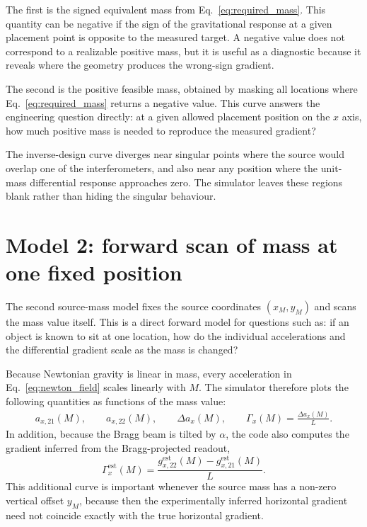 \documentclass[11pt]{article}
\begin{document}
The first is the signed equivalent mass from Eq.~\eqref{eq:required_mass}. This quantity can be negative if the sign of the gravitational response at a given placement point is opposite to the measured target. A negative value does not correspond to a realizable positive mass, but it is useful as a diagnostic because it reveals where the geometry produces the wrong-sign gradient.

The second is the positive feasible mass, obtained by masking all locations where Eq.~\eqref{eq:required_mass} returns a negative value. This curve answers the engineering question directly: at a given allowed placement position on the $x$ axis, how much positive mass is needed to reproduce the measured gradient?

The inverse-design curve diverges near singular points where the source would overlap one of the interferometers, and also near any position where the unit-mass differential response approaches zero. The simulator leaves these regions blank rather than hiding the singular behaviour.

\section{Model 2: forward scan of mass at one fixed position}

The second source-mass model fixes the source coordinates $(x_M, y_M)$ and scans the mass value itself. This is a direct forward model for questions such as: if an object is known to sit at one location, how do the individual accelerations and the differential gradient scale as the mass is changed?

Because Newtonian gravity is linear in mass, every acceleration in Eq.~\eqref{eq:newton_field} scales linearly with $M$. The simulator therefore plots the following quantities as functions of the mass value:
\begin{align}
 a_{x,21}(M), \qquad a_{x,22}(M), \qquad \Delta a_x(M), \qquad \Gamma_x(M) = \frac{\Delta a_x(M)}{L}.
\end{align}
In addition, because the Bragg beam is tilted by $\alpha$, the code also computes the gradient inferred from the Bragg-projected readout,
\begin{equation}
 \Gamma^{\mathrm{est}}_x(M) = \frac{g^{\mathrm{est}}_{x,22}(M) - g^{\mathrm{est}}_{x,21}(M)}{L}.
\end{equation}
This additional curve is important whenever the source mass has a non-zero vertical offset $y_M$, because then the experimentally inferred horizontal gradient need not coincide exactly with the true horizontal gradient.
\end{document}
